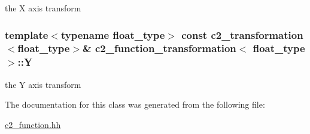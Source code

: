the X axis transform 

\subsubsection[{\texorpdfstring{Y}{Y}}]{\setlength{\rightskip}{0pt plus 5cm}template$<$typename float\+\_\+type$>$ const {\bf c2\+\_\+transformation}$<$float\+\_\+type$>$\& {\bf c2\+\_\+function\+\_\+transformation}$<$ float\+\_\+type $>$\+::Y}\hypertarget{classc2__function__transformation_a867523e0adfac76943984aa5a26d4274}{}\label{classc2__function__transformation_a867523e0adfac76943984aa5a26d4274}


the Y axis transform 



The documentation for this class was generated from the following file\+:\begin{DoxyCompactItemize}
\item 
\hyperlink{c2__function_8hh}{c2\+\_\+function.\+hh}\end{DoxyCompactItemize}
